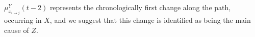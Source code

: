 \documentclass[10pt,letterpaper]{article}
\begin{document}
$\mu^{Y}_{x_{i\rightarrow j}}(t-2)$ represents the chronologically first change along the path, occurring in $X$, and we suggest that this change is identified as being the main cause of $Z$.




\setlength{\bibleftmargin}{.125in}
\setlength{\bibindent}{-\bibleftmargin}


\end{document}
